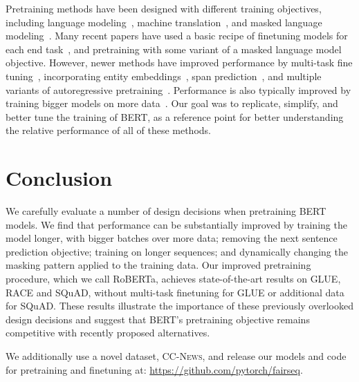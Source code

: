 \documentclass[11pt]{article}
\newcommand{\ourmodel}{RoBERTa}
\begin{document}
Pretraining methods have been designed with different training objectives, including language modeling~\cite{dai2015semi,peters2018deep,howard2018universal},  machine translation~\cite{mccann2017learned}, and masked language modeling~\cite{devlin2018bert,lample2019cross}. Many recent papers have used a basic recipe of  finetuning models for each end task~\cite{howard2018universal,radford2018gpt}, and pretraining with some variant of a masked language model objective.  However, newer methods have improved performance by multi-task fine tuning~\cite{dong2019unified}, incorporating entity embeddings~\cite{sun2019ernie}, span prediction~\cite{joshi2019spanbert}, and multiple variants of autoregressive pretraining~\cite{song2019mass,chan2019kermit,yang2019xlnet}.  Performance is also typically improved by training bigger models on more data~\cite{devlin2018bert,baevski2019cloze,yang2019xlnet,radford2019language}. Our goal was to replicate, simplify, and better tune the training of BERT, as a reference point for better understanding the relative performance of all of these methods. 

 \section{Conclusion} \label{sec:conclusion}

We carefully evaluate a number of design decisions when pretraining BERT models.
We find that performance can be substantially improved by training the model longer, with bigger batches over more data; removing the next sentence prediction objective; training on longer sequences; and dynamically changing the masking pattern applied to the training data.
Our improved pretraining procedure, which we call \ourmodel{}, achieves state-of-the-art results on GLUE, RACE and SQuAD, without multi-task finetuning for GLUE or additional data for SQuAD.
These results illustrate the importance of these previously overlooked design decisions and suggest that BERT's pretraining objective remains competitive with recently proposed alternatives.

We additionally use a novel dataset, \textsc{CC-News}, and release our models and code for pretraining and finetuning at: \url{https://github.com/pytorch/fairseq}. 



\appendix
\end{document}
